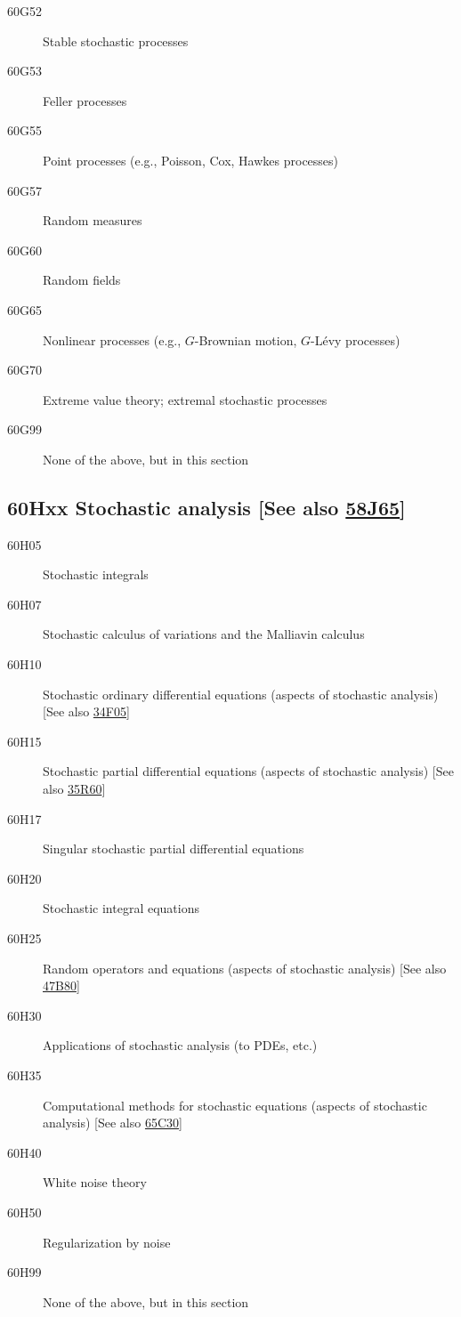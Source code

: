 \documentclass[letterpaper]{article}
\begin{document}
\begin{description}
\item [60G52]\label{60G52} Stable stochastic processes
\item [60G53]\label{60G53} Feller processes
\item [60G55]\label{60G55} Point processes (e.g., Poisson, Cox, Hawkes processes)
\item [60G57]\label{60G57} Random measures
\item [60G60]\label{60G60} Random fields
\item [60G65]\label{60G65} Nonlinear processes (e.g., $G$-Brownian motion, $G$-L\'{e}vy processes)
\item [60G70]\label{60G70} Extreme value theory; extremal stochastic processes
\item [60G99]\label{60G99} None of the above, but in this section
\end{description}
\subsection*{60Hxx  Stochastic analysis [See also \hyperref[58J65]{58J65}] }\label{60Hxx}
\begin{description}  
\item [60H05]\label{60H05} Stochastic integrals
\item [60H07]\label{60H07} Stochastic calculus of variations and the Malliavin calculus
\item [60H10]\label{60H10} Stochastic ordinary differential equations (aspects of stochastic analysis) [See also \hyperref[34F05]{34F05}]
\item [60H15]\label{60H15} Stochastic partial differential equations (aspects of stochastic analysis) [See also \hyperref[35R60]{35R60}]
\item [60H17]\label{60H17} Singular stochastic partial differential equations
\item [60H20]\label{60H20} Stochastic integral equations
\item [60H25]\label{60H25} Random operators and equations (aspects of stochastic analysis) [See also \hyperref[47B80]{47B80}]
\item [60H30]\label{60H30} Applications of stochastic analysis (to PDEs, etc.)
\item [60H35]\label{60H35} Computational methods for stochastic equations (aspects of stochastic analysis) [See also \hyperref[65C30]{65C30}]
\item [60H40]\label{60H40} White noise theory
\item [60H50]\label{60H50} Regularization by noise
\item [60H99]\label{60H99} None of the above, but in this section
\end{description}
\end{document}
